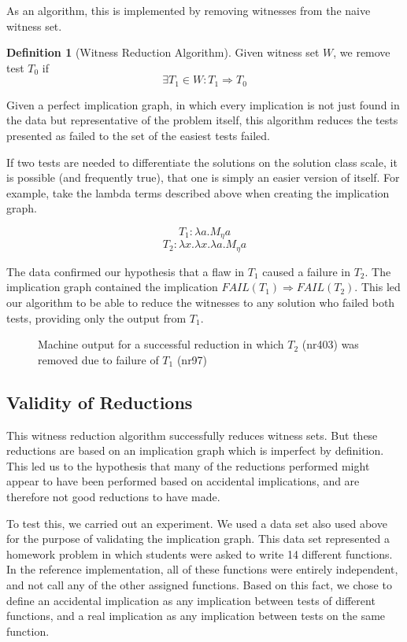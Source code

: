 \documentclass[11pt,twoside]{article}
\newcommand\fail{\mathit{FAIL}}
\theoremstyle{definition}
\newtheorem{defn}{Definition}
\begin{document}
As an algorithm, this is implemented by removing witnesses from the naive witness set.
\begin{defn}[Witness Reduction Algorithm]
Given witness set $W$, we remove test $T_0$ if
$$\exists T_1 \in W : T_1 \Rightarrow T_0$$
\end{defn}

Given a perfect implication graph, in which every implication is not just found in the data but representative of the problem itself, this algorithm reduces the tests presented as  failed to the set of the easiest tests failed. 

If two tests are needed to differentiate the solutions on the solution class scale, it is possible (and frequently true), that one is simply an easier version of itself. For example, take the lambda terms described above when creating the implication graph. 

$$T_1 : \lambda a.M_\eta a$$
$$T_2 : \lambda x.\lambda x.\lambda a.M_\eta a$$

The data confirmed our hypothesis that a flaw in $T_1$ caused a failure in $T_2$. The implication graph contained the implication $\fail(T_1) \Rightarrow \fail(T_2)$. This led our algorithm to be able to reduce the witnesses to any solution who failed both tests, providing only the output from $T_1$.

\begin{figure}

\caption{Machine output for a successful reduction in which $T_2$ (nr403) was removed due to failure of $T_1$ (nr97)}
\end{figure}

\subsection{Validity of Reductions}

This witness reduction algorithm successfully reduces witness sets. But these reductions are based on an implication graph which is imperfect by definition. This led us to the hypothesis that many of the reductions performed might appear to have been performed based on accidental implications, and are therefore not good reductions to have made.

To test this, we carried out an experiment. We used a data set also used above for the purpose of validating the implication graph. This data set represented a homework problem in which students were asked to write 14 different functions. In the reference implementation, all of these functions were entirely independent, and not call any of the other assigned functions. Based on this fact, we chose to define an accidental implication as any implication between tests of different functions, and a real implication as any implication between tests on the same function.
\end{document}
